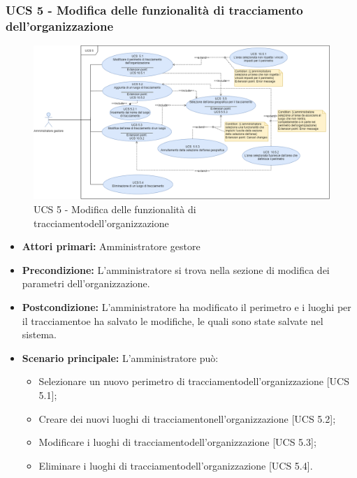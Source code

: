 \subsubsection{UCS 5 - Modifica delle funzionalità di tracciamento dell'organizzazione}%
\begin{figure}[h]
	\centering
    \includegraphics[scale=0.40]{Sezioni/UseCase/Immagini/UCS5.png}
    \caption{UCS 5 - Modifica delle funzionalità di tracciamentodell'organizzazione}
\end{figure}
\begin{itemize}
    \item \textbf{Attori primari:} Amministratore gestore
    \item \textbf{Precondizione:} L'amministratore si trova nella sezione di modifica dei parametri dell'organizzazione.
    \item \textbf{Postcondizione:} L'amministratore ha modificato il perimetro e i luoghi per il tracciamentoe ha salvato le modifiche, le quali sono state salvate nel sistema.
    \item \textbf{Scenario principale:} L'amministratore può:
    \begin{itemize}    
        \item Selezionare un nuovo perimetro di tracciamentodell'organizzazione [UCS 5.1];
        \item Creare dei nuovi luoghi di tracciamentonell'organizzazione [UCS 5.2];
        \item Modificare i luoghi di tracciamentodell'organizzazione [UCS 5.3];
        \item Eliminare i luoghi di tracciamentodell'organizzazione [UCS 5.4].
    \end{itemize}
\end{itemize}

